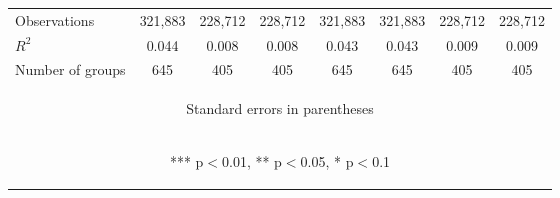 \documentclass[]{article}
\begin{document}
\begin{center}
\begin{tabular}{lccccccc}
Observations & 321,883 & 228,712 & 228,712 & 321,883 & 321,883 & 228,712 & 228,712 \\
$R^2$ & 0.044 & 0.008 & 0.008 & 0.043 & 0.043 & 0.009 & 0.009 \\
 Number of groups & 645 & 405 & 405 & 645 & 645 & 405 & 405 \\ \hline
\multicolumn{8}{c}{\begin{footnotesize} Standard errors in parentheses\end{footnotesize}} \\
\multicolumn{8}{c}{\begin{footnotesize} *** p$<$0.01, ** p$<$0.05, * p$<$0.1\end{footnotesize}} \\
\end{tabular}
\end{center}
\end{document}
